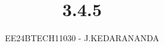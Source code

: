 \documentclass[journal]{IEEEtran}
\begin{document}

\vspace{3cm}

\title{3.4.5}
\author{EE24BTECH11030 - J.KEDARANANDA}
{\let\newpage\relax\maketitle}

\renewcommand{\thefigure}{\theenumi}
\renewcommand{\thetable}{\theenumi}
\setlength{\intextsep}{10pt} %


\renewcommand{\thetable}{\theenumi}
\end{document}
